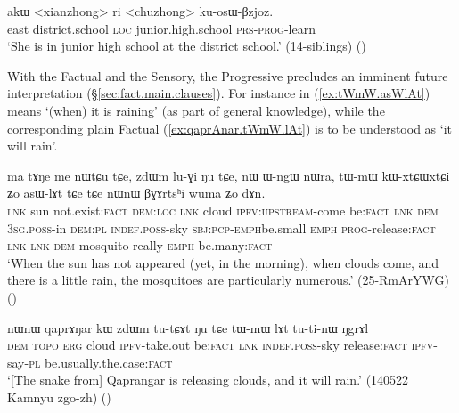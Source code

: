 \begin{exe}
\ex \label{ex:kosWBzjoz}
\gll  akɯ <xianzhong> ri <chuzhong> ku-osɯ-βzjoz. \\
east district.school \textsc{loc} junior.high.school \textsc{prs}-\textsc{prog}-learn \\
\glt `She is in junior high school at the district school.' (14-siblings) ()
 \end{exe}

With the Factual and the Sensory, the Progressive precludes an imminent future interpretation (§\ref{sec:fact.main.clauses}).  For instance  in (\ref{ex:tWmW.asWlAt}) means `(when) it is raining' (as part of general knowledge), while the corresponding plain Factual  (\ref{ex:qaprAnar.tWmW.lAt}) is to be understood as `it will rain'.


\begin{exe}
\ex \label{ex:tWmW.asWlAt}
\gll ma tɤŋe me nɯtɕu tɕe, zdɯm lu-ɣi ŋu tɕe, nɯ ɯ-ngɯ nɯra, tɯ-mɯ kɯ-xtɕɯ\redp{}xtɕi ʑo asɯ-lɤt tɕe tɕe nɯnɯ βɣɤrtsʰi wuma ʑo dɤn. \\
\textsc{lnk} sun not.exist:\textsc{fact} \textsc{dem}:\textsc{loc} \textsc{lnk} cloud \textsc{ipfv}:\textsc{upstream}-come be:\textsc{fact} \textsc{lnk} \textsc{dem} \textsc{3sg}.\textsc{poss}-in \textsc{dem}:\textsc{pl} \textsc{indef}.\textsc{poss}-sky \textsc{sbj}:\textsc{pcp}-\textsc{emph}\redp{}be.small \textsc{emph} \textsc{prog}-release:\textsc{fact} \textsc{lnk} \textsc{lnk} \textsc{dem} mosquito really \textsc{emph} be.many:\textsc{fact} \\
\glt  `When the sun has not appeared (yet, in the morning), when clouds come, and there is a little rain, the mosquitoes are particularly numerous.' (25-RmArYWG) ()
\end{exe}
 
\begin{exe}
\ex \label{ex:qaprAnar.tWmW.lAt}
\gll nɯnɯ qaprɤŋar kɯ zdɯm tu-tɕɤt ŋu tɕe tɯ-mɯ lɤt tu-ti-nɯ ŋgrɤl \\
\textsc{dem}  \textsc{topo} \textsc{erg} cloud \textsc{ipfv}-take.out be:\textsc{fact} \textsc{lnk} \textsc{indef}.\textsc{poss}-sky release:\textsc{fact} \textsc{ipfv}-say-\textsc{pl} be.usually.the.case:\textsc{fact} \\
\glt `[The snake from] Qaprangar is releasing clouds, and it will rain.' (140522 Kamnyu zgo-zh) ()
\end{exe}

